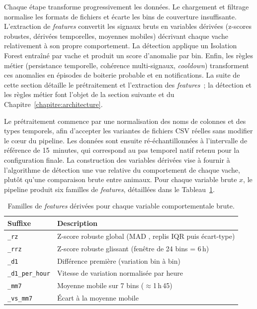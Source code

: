 Chaque étape transforme progressivement les données. Le chargement et filtrage normalise
les formats de fichiers et écarte les bins de couverture insuffisante. L'extraction de
\textit{features} convertit les signaux bruts en variables dérivées (z-scores robustes,
dérivées temporelles, moyennes mobiles) décrivant chaque vache relativement à son propre
comportement. La détection applique un Isolation Forest entraîné par vache et produit un
score d'anomalie par bin. Enfin, les règles métier (persistance temporelle, cohérence
multi-signaux, \textit{cooldown}) transforment ces anomalies en épisodes de boiterie probable et en
notifications. La suite de cette section détaille le prétraitement et l'extraction des
\textit{features}~; la détection et les règles métier font l'objet de la section suivante et
du Chapitre~\ref{chapitre:architecture}.

\FloatBarrier

Le prétraitement commence par une normalisation des noms de colonnes et des types temporels,
afin d'accepter les variantes de fichiers CSV réelles sans modifier le cœur du pipeline.
Les données sont ensuite ré-échantillonnées à l'intervalle de référence de 15~minutes,
qui correspond au pas temporel natif retenu pour la configuration finale. La construction
des variables dérivées vise à fournir à l'algorithme de détection une vue relative du
comportement de chaque vache, plutôt qu'une comparaison brute entre animaux.
Pour chaque variable brute $x$, le pipeline produit six familles de \textit{features}, détaillées
dans le Tableau~\ref{tab:features}.

\begin{table}[H]
    \centering
    \caption{Familles de \textit{features} dérivées pour chaque variable comportementale brute.}
    \label{tab:features}
    \begin{tabular}{lp{8cm}}
        \toprule
        \textbf{Suffixe}        & \textbf{Description} \\
        \midrule
        \texttt{\_rz}           & Z-score robuste global (MAD \citep{leys2013detecting}, replis IQR puis écart-type) \\
        \texttt{\_rrz}          & Z-score robuste glissant (fenêtre de 24 bins = 6\,h) \\
        \texttt{\_d1}           & Différence première (variation bin à bin) \\
        \texttt{\_d1\_per\_hour}& Vitesse de variation normalisée par heure \\
        \texttt{\_mm7}          & Moyenne mobile sur 7 bins ($\approx$1\,h\,45) \\
        \texttt{\_vs\_mm7}      & Écart à la moyenne mobile \\
        \bottomrule
    \end{tabular}
\end{table}


